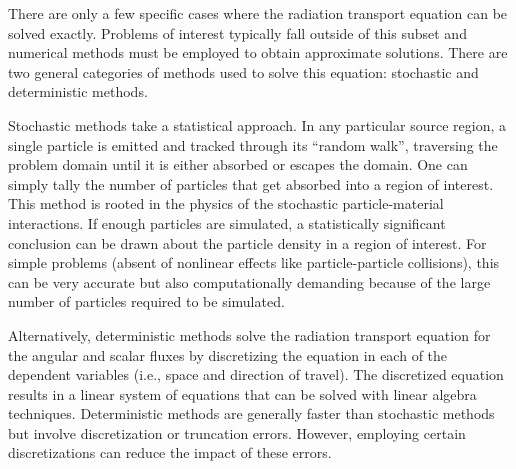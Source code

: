 \documentclass[12pt,letterpaper]{article}
\begin{document}
There are only a few specific cases where the radiation transport equation can be solved exactly. Problems of interest typically fall outside of this subset and numerical methods must be employed to obtain approximate solutions. There are two general categories of methods used to solve this equation: stochastic and deterministic methods.

Stochastic methods take a statistical approach. In any particular source region, a single particle is emitted and tracked through its ``random walk'', traversing the problem domain until it is either absorbed or escapes the domain. One can simply tally the number of particles that get absorbed into a region of interest. This method is rooted in the physics of the stochastic particle-material interactions. If enough particles are simulated, a statistically significant conclusion can be drawn about the particle density in a region of interest. For simple problems (absent of nonlinear effects like particle-particle collisions), this can be very accurate but also computationally demanding because of the large number of particles required to be simulated.

Alternatively, deterministic methods solve the radiation transport equation for the angular and scalar fluxes by discretizing the equation in each of the dependent variables (i.e., space and direction of travel). The discretized equation results in a linear system of equations that can be solved with linear algebra techniques. Deterministic methods are generally faster than stochastic methods but involve discretization or truncation errors. However, employing certain discretizations can reduce the impact of these errors.

\end{document}
